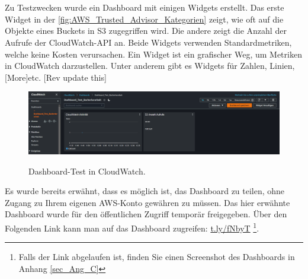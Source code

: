 \\\\
Zu Testzwecken wurde ein Dashboard mit einigen Widgets erstellt. Das erste Widget in der \autoref{fig:AWS_Trusted_Advisor_Kategorien} zeigt, wie oft auf die Objekte eines Buckets in S3 zugegriffen wird. Die andere zeigt die Anzahl der Aufrufe der CloudWatch-API an. Beide Widgets verwenden Standardmetriken, welche keine Kosten verursachen. Ein Widget ist ein grafischer Weg, um Metriken in CloudWatch darzustellen. Unter anderem gibt es Widgets für Zahlen, Linien, [More]etc.
[Rev update this]
\begin{figure}[h!]
  \centering
  \includegraphics[scale=0.5]{sources/CloudWatchDashboardTest}
  \caption[Dashboard-Test in CloudWatch]{}
  \label{fig:CloudWatchDashboardTest} 
  Dashboard-Test in CloudWatch.
\end{figure}
Es wurde bereits erwähnt, dass es möglich ist, das Dashboard zu teilen, ohne Zugang zu Ihrem eigenen AWS-Konto gewähren zu müssen. Das hier erwähnte Dashboard wurde für den öffentlichen Zugriff temporär freigegeben. Über den Folgenden Link kann man auf das Dashboard zugreifen: \url{t.ly/fNbyT} \footnote{Falls der Link abgelaufen ist, finden Sie einen Screenshot des Dashboards in Anhang \ref{sec_Ang_C}}. 


